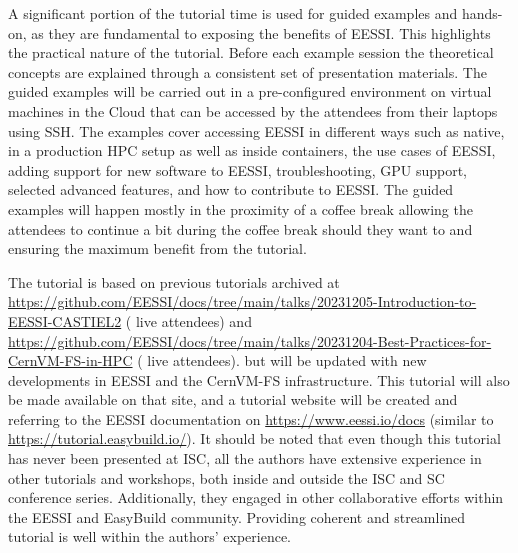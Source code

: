 A significant portion of the tutorial time is used for guided examples and hands-on,
as they are fundamental to exposing the benefits of EESSI.
This highlights the practical nature of the tutorial.
Before each example session the theoretical concepts are explained through a consistent set of presentation materials.
The guided examples will be carried out in a pre-configured environment on virtual machines in the Cloud that can be
accessed by the
attendees from their laptops using SSH. 
The examples cover accessing EESSI in different ways such as native, in a production HPC setup as well as inside
containers, the use cases of EESSI, adding support for new software to EESSI, troubleshooting, GPU support, selected
advanced features, and how to contribute to EESSI.
The guided examples will happen mostly in the proximity of a coffee break allowing the attendees to continue
a bit during the coffee break should they want to and ensuring the maximum benefit from the tutorial.

The tutorial is based on previous tutorials archived at
\url{https://github.com/EESSI/docs/tree/main/talks/20231205-Introduction-to-EESSI-CASTIEL2} ( live attendees) and
\url{https://github.com/EESSI/docs/tree/main/talks/20231204-Best-Practices-for-CernVM-FS-in-HPC} ( live attendees).
but will be updated with new developments in EESSI and the CernVM-FS infrastructure.
This tutorial will also be made available on that site, and a tutorial website will be created and referring to the EESSI documentation on
\url{https://www.eessi.io/docs} (similar to \url{https://tutorial.easybuild.io/}).
It should be noted that even though this tutorial has never been presented at ISC, all the authors have extensive
experience in other tutorials and workshops, both inside and outside the ISC and SC conference series. Additionally,
they engaged in other collaborative efforts within the EESSI and EasyBuild community. Providing coherent and streamlined
tutorial is well within the authors' experience.




